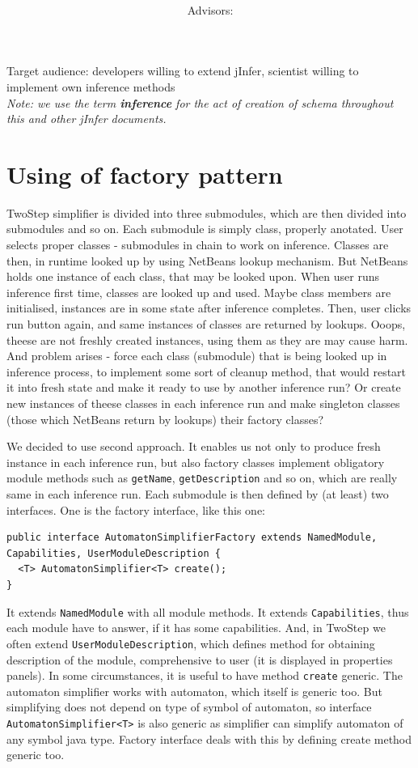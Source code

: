 \documentclass[a4paper,10pt,oneside]{article}
\title{\bf\mftitle}
\author{\mfauthor \\ Advisors: \mfadvisor}
\date{\mfplacedate}
\newcommand{\code}[1]{\texttt{#1}}
\begin{document}
\maketitle
Target audience: developers willing to extend jInfer, scientist willing to implement own inference methods\\

\emph{Note: we use the term \textbf{inference} for the act of creation of schema throughout this and other jInfer documents.}

\section{Using of factory pattern}
TwoStep simplifier is divided into three submodules, which are then divided into submodules and so on.
Each submodule is simply class, properly anotated.
User selects proper classes - submodules in chain to work on inference.
Classes are then, in runtime looked up by using NetBeans lookup mechanism.
But NetBeans holds one instance of each class, that may be looked upon.
When user runs inference first time, classes are looked up and used.
Maybe class members are initialised, instances are in some state after inference completes.
Then, user clicks run button again, and same instances of classes are returned by lookups.
Ooops, theese are not freshly created instances, using them as they are may cause harm.
And problem arises - force each class (submodule) that is being looked up in inference process, to implement
some sort of cleanup method, that would restart it into fresh state and make it ready to use by another 
inference run? Or create new instances of theese classes in each inference run and make singleton classes (those which NetBeans return by lookups) their factory classes?

We decided to use second approach. 
It enables us not only to produce fresh instance in each inference run, but also factory classes implement obligatory
module methods such as \code{getName}, \code{getDescription} and so on, which are really same in each inference run.
Each submodule is then defined by (at least) two interfaces.
One is the factory interface, like this one:
\begin{verbatim}
public interface AutomatonSimplifierFactory extends NamedModule, Capabilities, UserModuleDescription {
  <T> AutomatonSimplifier<T> create();
}
\end{verbatim}
It extends \code{NamedModule} with all module methods.
It extends \code{Capabilities}, thus each module have to answer, if it has some capabilities.
And, in TwoStep we often extend \code{UserModuleDescription}, which defines method for obtaining description of the module, comprehensive to user (it is displayed in properties panels).
In some circumstances, it is useful to have method \code{create} generic.
The automaton simplifier works with automaton, which itself is generic too.
But simplifying does not depend on type of symbol of automaton, so interface \code{AutomatonSimplifier<T>}
is also generic as simplifier can simplify automaton of any symbol java type.
Factory interface deals with this by defining create method generic too.
\end{document}
